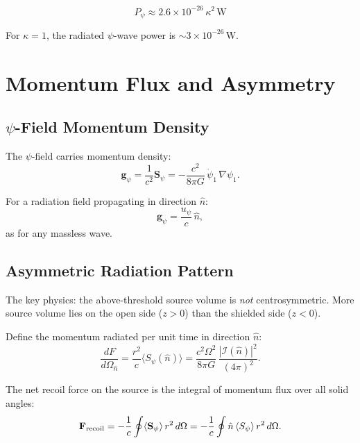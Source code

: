 \documentclass[11pt]{article}
\begin{document}
\begin{equation}\label{eq:power-result}
\boxed{P_\psi \approx 2.6 \times 10^{-26}\,\kappa^2\,\text{W}}
\end{equation}

For $\kappa = 1$, the radiated $\psi$-wave power is $\sim 3 \times 10^{-26}$\,W.

\section{Momentum Flux and Asymmetry}\label{sec:momentum}

\subsection{$\psi$-Field Momentum Density}

The $\psi$-field carries momentum density:
\begin{equation}\label{eq:momentum-density}
\mathbf{g}_\psi = \frac{1}{c^2}\mathbf{S}_\psi
  = -\frac{c^2}{8\pi G}\,\dot{\psi}_1\,\nabla\psi_1.
\end{equation}

For a radiation field propagating in direction $\hat{n}$:
\begin{equation}
\mathbf{g}_\psi = \frac{u_\psi}{c}\,\hat{n},
\end{equation}
as for any massless wave.

\subsection{Asymmetric Radiation Pattern}

The key physics: the above-threshold source volume is \emph{not}
centrosymmetric. More source volume lies on the open side ($z > 0$)
than the shielded side ($z < 0$).

Define the momentum radiated per unit time in direction $\hat{n}$:
\begin{equation}
\frac{dF}{d\Omega_{\hat{n}}} = \frac{r^2}{c}\langle S_\psi(\hat{n})\rangle
  = \frac{c^2\Omega^2}{8\pi G}\,\frac{|\mathcal{I}(\hat{n})|^2}{(4\pi)^2}.
\end{equation}

The net recoil force on the source is the integral of momentum flux
over all solid angles:
\begin{equation}\label{eq:recoil}
\mathbf{F}_{\rm recoil} = -\frac{1}{c} \oint \langle \mathbf{S}_\psi \rangle\,
  r^2\,d\Omega = -\frac{1}{c} \oint \hat{n}\,\langle S_\psi \rangle\,
  r^2\,d\Omega.
\end{equation}
\end{document}
